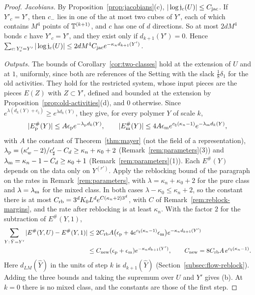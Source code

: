 \begin{proof}
\emph{Jacobians.} By Proposition~\ref{prop:jacobians}(c), $|\log\mathfrak j_c(U)|\le C_{\rm jac}$. If $Y'_c=Y'$, then $c_-$ lies in one of the at most two cubes of $Y'$, each of which contains $M^4$ points of $\mathbb T^{(k+1)}$, and $c$ has one of $d$ directions. So at most $2dM^4$ bonds $c$ have $Y'_c=Y'$, and they exist only if $d_{k+1}(Y')=0$. Hence $\sum_{c:\,Y'_c=Y'}|\log\mathfrak j_c(U)|\le2dM^4C_{\rm jac}e^{-\kappa_nd_{k+1}(Y')}$.

\emph{Outputs.} The bounds of Corollary~\ref{cor:two-classes} hold at the extension of $U$ and at $1$, uniformly, since both are references of the Setting with the slack $\frac18\delta_1$ for the old activities. They hold for the restricted system, whose input pieces are the pieces $E(Z)$ with $Z\subset Y'$, defined and bounded at the extension by Proposition~\ref{prop:old-activities}(d), and $0$ otherwise. Since $e^{\lambda(d_k(Y)+c_\natural)}\ge e^{\lambda d_k(Y)}$, they give, for every polymer $Y$ of scale $k$,
\[
|E^\#_{\rm p}(Y)|\le A\epsilon_{\rm p}e^{-\lambda_{\rm p}d_k(Y)},\qquad|E^\#_{\rm m}(Y)|\le4A\epsilon_{\rm m}e^{c_\natural(\kappa_n-1)}e^{-\lambda_{\rm m}d_k(Y)},
\]
with $A$ the constant of Theorem~\ref{thm:mayer} (not the field of a representation), $\lambda_{\rm p}=(\kappa'_w-2)/c'_\sharp-C_d\ge\kappa_n+\kappa_0+2$ (Remark~\ref{rem:parameters}(3)) and $\lambda_{\rm m}=\kappa_n-1-C_d\ge\kappa_0+1$ (Remark~\ref{rem:parameters}(1)). Each $E^\#(Y)$ depends on the data only on $Y^{(r')}$. Apply the reblocking bound of the paragraph on the rates in Remark~\ref{rem:parameters}, with $\lambda=\kappa_n+\kappa_0+2$ for the pure class and $\lambda=\lambda_{\rm m}$ for the mixed class. In both cases $\lambda-\kappa_0\le\kappa_n+2$, so the constant there is at most $C_{\rm rb}=3^dK_0L^de^{C(\kappa_n+2)3^d}$, with $C$ of Remark~\ref{rem:reblock-margins}, and the rate after reblocking is at least $\kappa_n$. With the factor $2$ for the subtraction of $E^\#(Y,1)$,
\[
\begin{aligned}
\sum_{Y:\,\hat Y=Y'}|E^\#(Y,U)-E^\#(Y,1)|&\le2C_{\rm rb}A\big(\epsilon_{\rm p}+4e^{c_\natural(\kappa_n-1)}\epsilon_{\rm m}\big)e^{-\kappa_nd_{k+1}(Y')}\\
&\le C_{\rm new}(\epsilon_{\rm p}+\epsilon_{\rm m})e^{-\kappa_nd_{k+1}(Y')},\qquad C_{\rm new}=8C_{\rm rb}A\,e^{c_\natural(\kappa_n-1)} .
\end{aligned}
\]
Here $d_{LM}(\hat Y)$ in the units of step $k$ is $d_{k+1}(\hat Y)$ (Section~\ref{subsec:flow-reblock}). Adding the three bounds and taking the supremum over $U$ and $Y'$ gives (b). At $k=0$ there is no mixed class, and the constants are those of the first step.


\end{proof}
